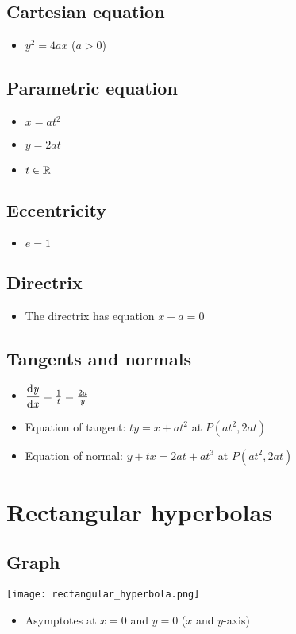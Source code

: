 \subsection{Cartesian equation}
\begin{itemize}
    \item $y^2=4ax$ ($a>0$)
\end{itemize}
\subsection{Parametric equation}
\begin{itemize}
    \item $x=at^2$
    \item $y=2at$
    \item $t\in \operatorname{\mathbb{R}}$
\end{itemize}
\subsection{Eccentricity}
\begin{itemize}
    \item $e=1$
\end{itemize}
\subsection{Directrix}
\begin{itemize}
    \item The directrix has equation $x+a=0$
\end{itemize}
\subsection{Tangents and normals}
\begin{itemize}
    \item $\dfrac{\operatorname{\mathrm{d}\mathit{y}}}{\operatorname{\mathrm{d}\mathit{x}}} = \frac{1}{t} = \frac{2a}{y}$
    \item Equation of tangent: $ty=x+at^2$ at $P(at^2, 2at)$
    \item Equation of normal: $y+tx=2at+at^3$ at $P(at^2, 2at)$
\end{itemize}

\section{Rectangular hyperbolas}
\subsection{Graph}
\texttt{[image: rectangular\_hyperbola.png]}
\begin{itemize}
    \item Asymptotes at $x=0$ and $y=0$ ($x$ and $y$-axis)
\end{itemize}
